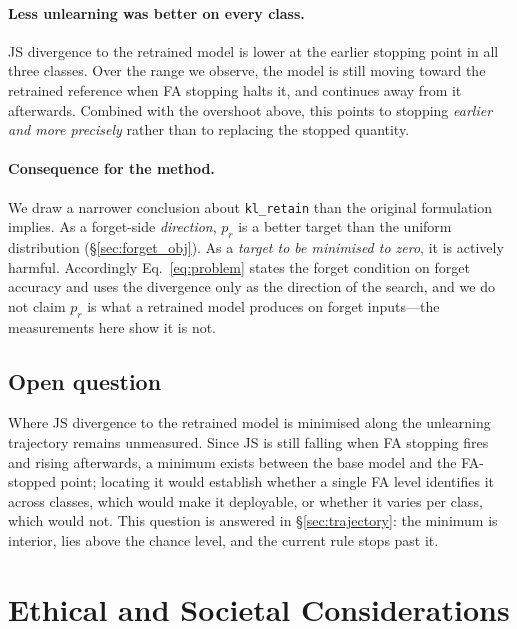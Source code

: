 \documentclass{article}
\newcommand{\klr}{\texttt{kl\_retain}}
\newcommand{\rev}[1]{{\color{revisedB}#1}}
\theoremstyle{remark}
\theoremstyle{plain}
\begin{document}
\paragraph{Less unlearning was better on every class.}
JS divergence to the retrained model is lower at the earlier stopping point in
all three classes. Over the range we observe, the model is still moving toward
the retrained reference when FA stopping halts it, and continues away from it
afterwards. Combined with the overshoot above, this points to stopping
\emph{earlier and more precisely} rather than to replacing the stopped quantity.

\paragraph{Consequence for the method.}
We draw a narrower conclusion about \klr{} than the original formulation
implies. As a forget-side \emph{direction}, $p_r$ is a better target than the
uniform distribution (\S\ref{sec:forget_obj}). As a \emph{target to be minimised
to zero}, it is actively harmful. \rev{Accordingly Eq.~\ref{eq:problem} states
the forget condition on forget accuracy and uses the divergence only as the
direction of the search}, and we do not claim $p_r$ is what a retrained model produces on forget
inputs---the measurements here show it is not.

\subsection{Open question}

Where JS divergence to the retrained model is minimised along the unlearning
trajectory remains unmeasured. Since JS is still falling when FA stopping fires
and rising afterwards, a minimum exists between the base model and the FA-stopped
point; locating it would establish whether a single FA level identifies it across
classes, which would make it deployable, or whether it varies per class, which
would not.
This question is answered in \S\ref{sec:trajectory}: the minimum is interior, lies above the chance level, and the current rule stops past it.

\section{Ethical and Societal Considerations}\label{app:ethics}
\end{document}
